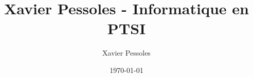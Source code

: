 \documentclass[
	fontsize=10pt, %
	twoside=true, %
]{kaobook}
\newcommand{\repRel}{../../../..}
\newcommand{\repStyle}{\repRel/Style}
\begin{document}

\titlehead{Xavier Pessoles - Informatique en PTSI }
\title[Xavier Pessoles - Informatique en PTSI]{Xavier Pessoles - Informatique en PTSI}
\author[XP]{Xavier Pessoles}
\date{\today}


\begingroup %
\endgroup

%
\mainmatter %
%
%
%
%


\setcounter{margintocdepth}{\sectiontocdepth}
\marginlayout
\graphicspath{{\repStyle/png}}

\pagestyle{xp.scrheadings}



%



\newcommand{\repExo}{Application_01_ROV}
\newcommand{\nomExo}{Application_01_ROV}

\livrettrue %
\livretfalse
\collefalse

\setcounter{chapter}{5}
\proffalse

\end{document}
